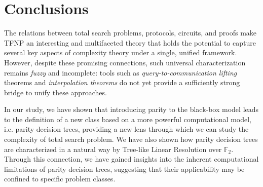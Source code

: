 \chapter*{Conclusions}


The relations between total search problems, protocols, circuits, and proofs make \textsf{TFNP} an interesting and multifaceted theory that holds the potential to capture several key aspects of complexity theory under a single, unified framework. However, despite these promising connections, such universal characterization remains \textit{fuzzy} and incomplete: tools such as \textit{query-to-communication lifting} theorems and \textit{interpolation theorems} do not yet provide a sufficiently strong bridge to unify these approaches.

In our study, we have shown that introducing parity to the black-box model leads to the definition of a new class based on a more powerful computational model, i.e. parity decision trees, providing a new lens through which we can study the complexity of total search problem. We have also shown how parity decision trees are characterized in a natural way by Tree-like Linear Resolution over $\mathbb{F}_2$. Through this connection, we have gained insights into the inherent computational limitations of parity decision trees, suggesting that their applicability may be confined to specific problem classes.

\hypersetup{linkcolor=blue}

